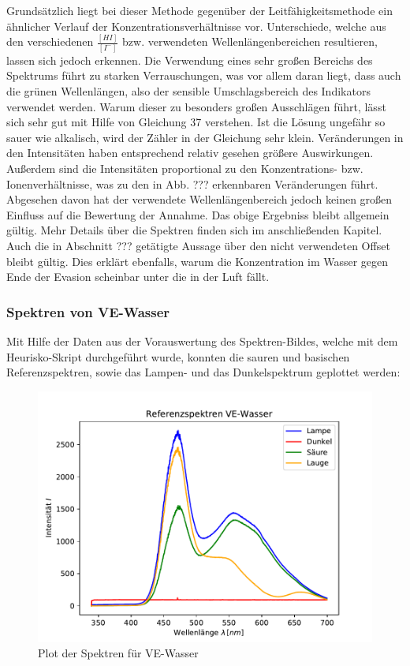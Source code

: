 \documentclass[12pt]{article}
\begin{document}
Grundsätzlich liegt bei dieser Methode gegenüber der Leitfähigkeitsmethode ein ähnlicher Verlauf der Konzentrationsverhältnisse vor.
Unterschiede, welche aus den verschiedenen $\frac{[HI]}{[I^-]}$ bzw. verwendeten Wellenlängenbereichen resultieren, lassen sich jedoch erkennen.
Die Verwendung eines sehr großen Bereichs des Spektrums führt zu starken Verrauschungen, was vor allem daran liegt, dass auch die grünen Wellenlängen,
also der sensible Umschlagsbereich des Indikators verwendet werden. Warum dieser zu besonders großen Ausschlägen führt, lässt sich sehr gut mit Hilfe von
\cite{jaehne} Gleichung 37 verstehen. Ist die Lösung ungefähr so sauer wie alkalisch, wird der Zähler in der Gleichung sehr klein.
Veränderungen in den Intensitäten haben entsprechend relativ gesehen größere Auswirkungen. Außerdem sind die Intensitäten proportional zu
den Konzentrations- bzw. Ionenverhältnisse, was zu den in Abb. ??? erkennbaren Veränderungen führt. Abgesehen davon hat der verwendete
Wellenlängenbereich jedoch keinen großen Einfluss auf die Bewertung der Annahme. Das obige Ergebniss bleibt allgemein gültig. Mehr Details über die 
Spektren finden sich im anschließenden Kapitel.\\
Auch die in Abschnitt ??? getätigte Aussage über den nicht verwendeten Offset bleibt gültig. Dies erklärt ebenfalls, warum die Konzentration
im Wasser gegen Ende der Evasion scheinbar unter die in der Luft fällt.

\subsubsection{Spektren von VE-Wasser}

Mit Hilfe der Daten aus der Vorauswertung des Spektren-Bildes, welche mit dem Heurisko-Skript durchgeführt wurde, konnten die sauren und basischen
Referenzspektren, sowie das Lampen- und das Dunkelspektrum geplottet werden:

\begin{figure}[H]
	\centering
	\includegraphics[width=120mm]{VE-Wasser/Referenzspektren}
	\caption{Plot der Spektren für VE-Wasser}
\end{figure}
\end{document}
